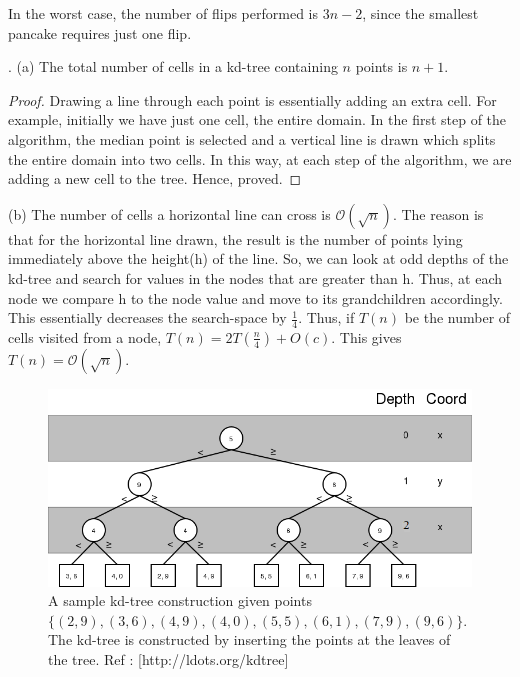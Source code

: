 \documentclass[assign]{article}
\begin{document}
\noindent In the worst case, the number of flips performed is $3n-2$, since the smallest pancake requires just one flip.

\vspace{10pt}

. (a) The total number of cells in a kd-tree containing $n$ points is $n+1$. 

\begin{proof}
  Drawing a line through each point is essentially adding an extra cell. For example, initially we have just one cell, the entire domain. In the first step of the algorithm, the median point is selected and a vertical line is drawn which splits the entire domain into two cells. In this way, at each step of the algorithm, we are adding a new cell to the tree. Hence, proved.
\end{proof}

\noindent (b) The number of cells a horizontal line can cross is $\mathcal{O}(\sqrt{n})$. The reason is that for the horizontal line drawn, the result is the number of points lying immediately above the height(h) of the line. So, we can look at odd depths of the kd-tree and search for values in the nodes that are greater than h. Thus, at each node we compare h to the node value and move to its grandchildren accordingly. This essentially decreases the search-space by $\frac{1}{4}$. Thus, if $T(n)$ be the number of cells visited from a node, $T(n) = 2T(\frac{n}{4}) + O(c)$. This gives $T(n) = \mathcal{O}(
\sqrt{n})$.


\begin{figure}
  \includegraphics[width=\linewidth]{kdt.png}
   \caption{A sample kd-tree construction given points $\{ (2,9), (3,6), (4,9), (4,0), (5,5), (6,1), (7,9), (9,6) \}$. The kd-tree is constructed by inserting the points at the leaves of the tree. Ref : [http://ldots.org/kdtree]}
\end{figure}
\end{document}
